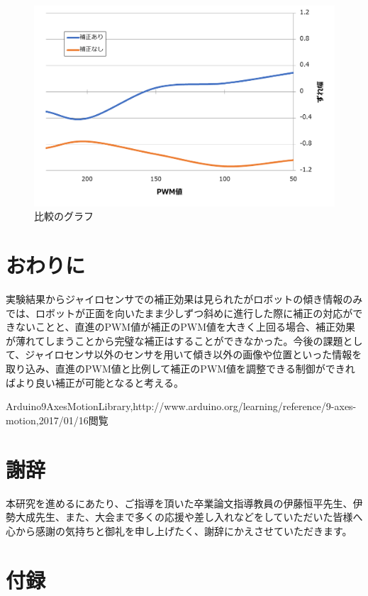 \documentclass[12pt,oneside]{sotsuken_paper}
\begin{document}
		\begin{figure}[htp]
			\begin{center}
				\includegraphics[width=120mm]{Image/図3.png}
				\caption{比較のグラフ}
				\label{図3}
			\end{center}
		\end{figure}

\chapter{おわりに}
実験結果からジャイロセンサでの補正効果は見られたがロボットの傾き情報のみでは、ロボットが正面を向いたまま少しずつ斜めに進行した際に補正の対応ができないことと、直進のPWM値が補正のPWM値を大きく上回る場合、補正効果が薄れてしまうことから完璧な補正はすることができなかった。今後の課題として、ジャイロセンサ以外のセンサを用いて傾き以外の画像や位置といった情報を取り込み、直進のPWM値と比例して補正のPWM値を調整できる制御ができればより良い補正が可能となると考える。

\begin{thebibliography}{1}
 Arduino9AxesMotionLibrary,http:{\slash}{\slash}www.arduino.org{\slash}learning{\slash}reference{\slash}9-axes-motion,2017{\slash}01{\slash}16閲覧
\end{thebibliography}

\chapter*{謝辞}
本研究を進めるにあたり、ご指導を頂いた卒業論文指導教員の伊藤恒平先生、伊勢大成先生、また、大会まで多くの応援や差し入れなどをしていただいた皆様へ心から感謝の気持ちと御礼を申し上げたく、謝辞にかえさせていただきます。

\chapter*{付録}
\appendix


\end{document}
